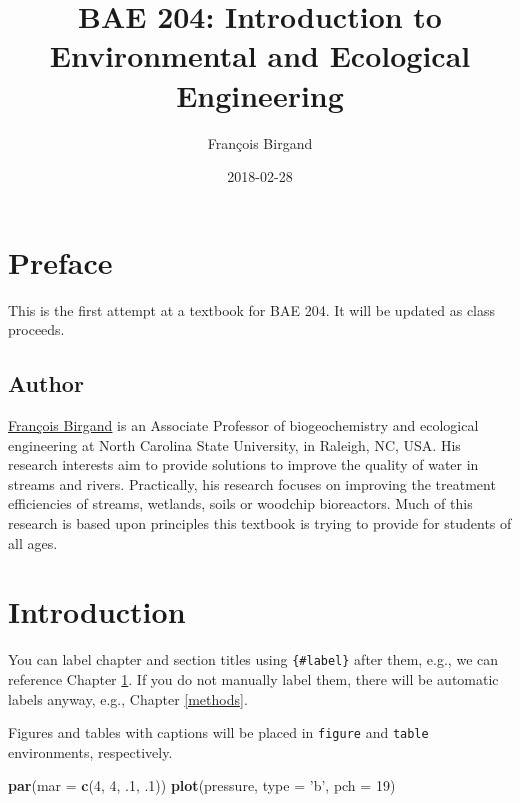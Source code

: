 \documentclass[]{book}
\title{BAE 204: Introduction to Environmental and Ecological Engineering}
\author{François Birgand}
\date{2018-02-28}
\newenvironment{Shaded}{\begin{snugshade}}{\end{snugshade}}
\newcommand{\KeywordTok}[1]{\textcolor[rgb]{0.13,0.29,0.53}{\textbf{#1}}}
\newcommand{\DataTypeTok}[1]{\textcolor[rgb]{0.13,0.29,0.53}{#1}}
\newcommand{\DecValTok}[1]{\textcolor[rgb]{0.00,0.00,0.81}{#1}}
\newcommand{\StringTok}[1]{\textcolor[rgb]{0.31,0.60,0.02}{#1}}
\newcommand{\NormalTok}[1]{#1}
\theoremstyle{definition}
\theoremstyle{definition}
\theoremstyle{definition}
\theoremstyle{remark}
\begin{document}
\maketitle

{
\setcounter{tocdepth}{1}
\tableofcontents
}
\chapter*{Preface}\label{preface}

This is the first attempt at a textbook for BAE 204. It will be updated
as class proceeds.

\section*{Author}\label{author}

\href{https://francoisbirgand.github.io}{François Birgand} is an
Associate Professor of biogeochemistry and ecological engineering at
North Carolina State University, in Raleigh, NC, USA. His research
interests aim to provide solutions to improve the quality of water in
streams and rivers. Practically, his research focuses on improving the
treatment efficiencies of streams, wetlands, soils or woodchip
bioreactors. Much of this research is based upon principles this
textbook is trying to provide for students of all ages.

\chapter{Introduction}\label{intro}

You can label chapter and section titles using \texttt{\{\#label\}}
after them, e.g., we can reference Chapter \ref{intro}. If you do not
manually label them, there will be automatic labels anyway, e.g.,
Chapter \ref{methods}.

Figures and tables with captions will be placed in \texttt{figure} and
\texttt{table} environments, respectively.

\begin{Shaded}
\begin{Highlighting}[]
\KeywordTok{par}\NormalTok{(}\DataTypeTok{mar =} \KeywordTok{c}\NormalTok{(}\DecValTok{4}\NormalTok{, }\DecValTok{4}\NormalTok{, .}\DecValTok{1}\NormalTok{, .}\DecValTok{1}\NormalTok{))}
\KeywordTok{plot}\NormalTok{(pressure, }\DataTypeTok{type =} \StringTok{'b'}\NormalTok{, }\DataTypeTok{pch =} \DecValTok{19}\NormalTok{)}
\end{Highlighting}
\end{Shaded}
\end{document}

